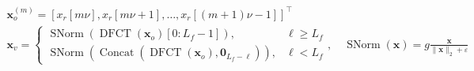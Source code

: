 ﻿\documentclass{article}
\begin{document}
\begin{preview}
\(\displaystyle
\begin{gathered}
  \bm{x}_o^{(m)}
  = [x_r[m\nu],x_r[m\nu+1],\dots,x_r[(m+1)\nu-1]]^\top \\
  \bm{x}_v
  =
  \begin{cases}
    \operatorname{SNorm}(\operatorname{DFCT}(\bm{x}_o)[0:L_f-1]), & \ell\geq L_f\\
    \operatorname{SNorm}(\operatorname{Concat}(\operatorname{DFCT}(\bm{x}_o),\bm{0}_{L_f-\ell})), & \ell<L_f
  \end{cases}, \quad
  \operatorname{SNorm}(\bm{x})
  = g\frac{\bm{x}}{\lVert\bm{x}\rVert_2+\varepsilon}
\end{gathered}
\)
\end{preview}
\end{document}

